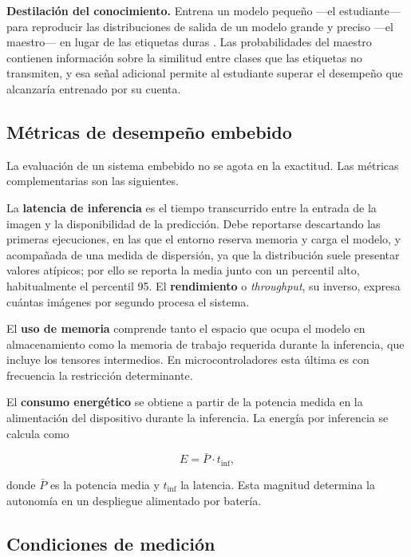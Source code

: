 \textbf{Destilación del conocimiento.} Entrena un modelo pequeño —el
estudiante— para reproducir las distribuciones de salida de un modelo grande
y preciso —el maestro— en lugar de las etiquetas duras \citep{hinton2015}.
Las probabilidades del maestro contienen información sobre la similitud
entre clases que las etiquetas no transmiten, y esa señal adicional permite
al estudiante superar el desempeño que alcanzaría entrenado por su cuenta.

\subsection{Métricas de desempeño embebido}

La evaluación de un sistema embebido no se agota en la exactitud. Las
métricas complementarias son las siguientes.

La \textbf{latencia de inferencia} es el tiempo transcurrido entre la
entrada de la imagen y la disponibilidad de la predicción. Debe reportarse
descartando las primeras ejecuciones, en las que el entorno reserva memoria
y carga el modelo, y acompañada de una medida de dispersión, ya que la
distribución suele presentar valores atípicos; por ello se reporta la media
junto con un percentil alto, habitualmente el percentil 95. El
\textbf{rendimiento} o \textit{throughput}, su inverso, expresa cuántas
imágenes por segundo procesa el sistema.

El \textbf{uso de memoria} comprende tanto el espacio que ocupa el modelo en
almacenamiento como la memoria de trabajo requerida durante la inferencia,
que incluye los tensores intermedios. En microcontroladores esta última es
con frecuencia la restricción determinante.

El \textbf{consumo energético} se obtiene a partir de la potencia medida en
la alimentación del dispositivo durante la inferencia. La energía por
inferencia se calcula como

\begin{equation}
E = \bar{P} \cdot t_{\text{inf}},
\label{eq:energia}
\end{equation}

\noindent donde $\bar{P}$ es la potencia media y $t_{\text{inf}}$ la
latencia. Esta magnitud determina la autonomía en un despliegue alimentado
por batería.

\subsection{Condiciones de medición}

